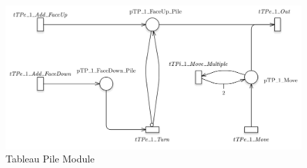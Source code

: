 \documentclass[runningheads,a4paper]{llncs}
\begin{document}
\begin{figure}
	\begin{center}
		\includegraphics[width=\textwidth]{images/tableauPile}
		\caption{Tableau Pile Module}
	\end{center}
\end{figure}
\end{document}
